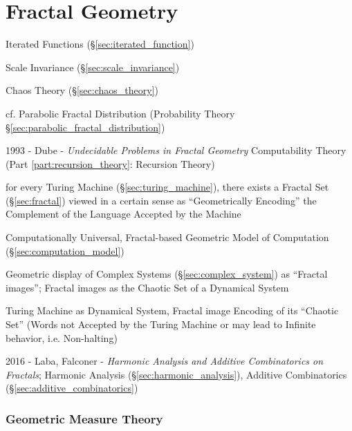 \part{Fractal Geometry}\label{sec:fractal_geometry}

Iterated Functions (\S\ref{sec:iterated_function})

Scale Invariance (\S\ref{sec:scale_invariance})

Chaos Theory (\S\ref{sec:chaos_theory})

cf. Parabolic Fractal Distribution (Probability Theory
\S\ref{sec:parabolic_fractal_distribution})

\asterism

1993 - Dube - \emph{Undecidable Problems in Fractal Geometry} \fist
Computability Theory (Part \ref{part:recursion_theory}: Recursion Theory)

for every Turing Machine (\S\ref{sec:turing_machine}), there exists a Fractal
Set (\S\ref{sec:fractal}) viewed in a certain sense as ``Geometrically
Encoding'' the Complement of the Language Accepted by the Machine

Computationally Universal, Fractal-based Geometric Model of Computation
(\S\ref{sec:computation_model})

Geometric display of Complex Systems (\S\ref{sec:complex_system}) as ``Fractal
images''; Fractal images as the Chaotic Set of a Dynamical System

Turing Machine as Dynamical System, Fractal image Encoding of its ``Chaotic
Set'' (Words not Accepted by the Turing Machine or may lead to Infinite
behavior, i.e. Non-halting)

\asterism

2016 - Laba, Falconer - \emph{Harmonic Analysis and Additive Combinatorics on
  Fractals}; Harmonic Analysis (\S\ref{sec:harmonic_analysis}), Additive
Combinatorics (\S\ref{sec:additive_combinatorics})



\section{Geometric Measure Theory}\label{sec:geometric_measure_theory}

